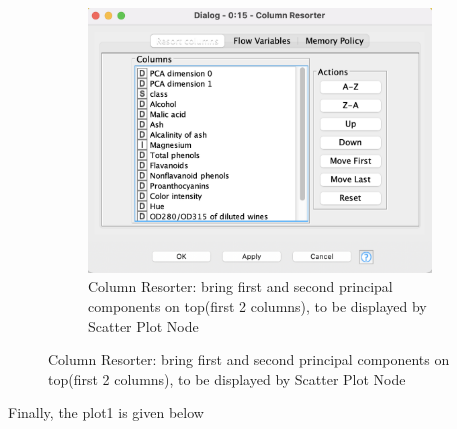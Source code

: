 \documentclass[11pt]{article}
\begin{document}
\begin{figure}[H]
\begin{subfigure}{0.4\textwidth}
					\label{fig:second}
				\end{subfigure}
				\hfill
				\begin{subfigure}{0.4\textwidth}
					\includegraphics[width=\textwidth]{res/t1/t11/t11-column-resorter-conf}
					\caption{Column Resorter: bring first and second principal components on top(first 2 columns), to be displayed by Scatter Plot Node}
					\label{fig:third}
				\end{subfigure}	
				\label{fig:figures}
			\end{figure}
			\fi
			Finally, the plot1 is given below

\end{document}
